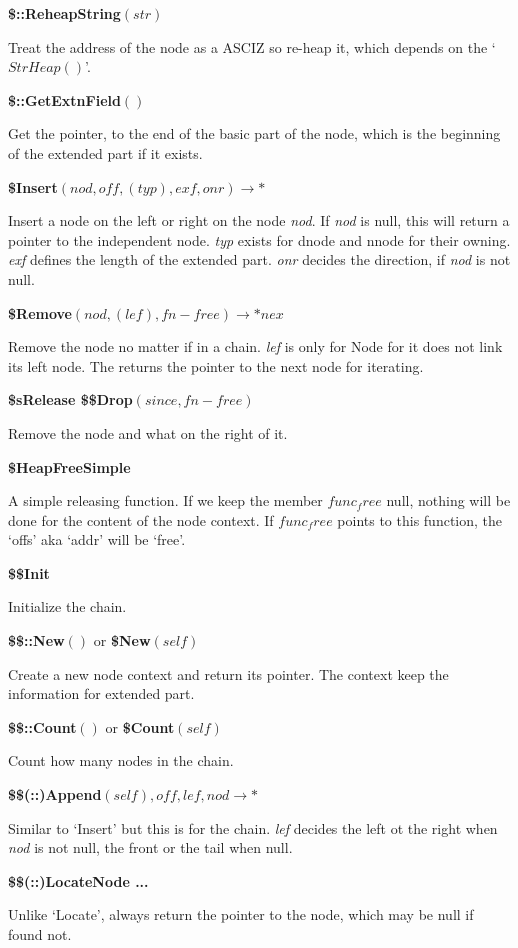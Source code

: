 \textbf{\$::ReheapString}$(str)$

Treat the address of the node as a ASCIZ so re-heap it, which depends on the `$StrHeap()$'.

\textbf{\$::GetExtnField}$()$

Get the pointer, to the end of the basic part of the node, which is the beginning of the extended part if it exists.

\textbf{\$Insert}$(nod,off,(typ),exf,onr)\rightarrow*$

Insert a node on the left or right on the node \textit{nod}. If \textit{nod} is null, this will return a pointer to the independent node. \textit{typ} exists for dnode and nnode for their owning. \textit{exf} defines the length of the extended part. \textit{onr} decides the direction, if \textit{nod} is not null.

\textbf{\$Remove}$(nod,(lef),fn-free)\rightarrow*nex$

Remove the node no matter if in a chain. \textit{lef} is only for Node for it does not link its left node. The returns the pointer to the next node for iterating.

\textbf{\$sRelease \$\$Drop}$(since,fn-free)$

Remove the node and what on the right of it.

\textbf{\$HeapFreeSimple}

A simple releasing function. If we keep the member $func_free$ null, nothing will be done for the content of the node context. If $func_free$ points to this function, the `offs' aka `addr' will be `free'.

\textbf{\$\$Init}

Initialize the chain.

\textbf{\$\$::New}$()$ or \textbf{\$New}$(self)$

Create a new node context and return its pointer. The context keep the information for extended part.

\textbf{\$\$::Count}$()$ or \textbf{\$Count}$(self)$

Count how many nodes in the chain.

\textbf{\$\$(::)Append}$(self),off,lef,nod\rightarrow*$

Similar to `Insert' but this is for the chain. \textit{lef} decides the left ot the right when \textit{nod} is not null, the front or the tail when null.

\textbf{\$\$(::)LocateNode ...}

Unlike `Locate', always return the pointer to the node, which may be null if found not.


